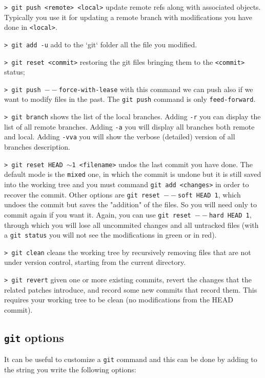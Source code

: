 \documentclass[11pt]{article}
\newcommand{\cmd}[1]{\colorbox{light-gray}{\textcolor{gio}{\texttt{#1}}}}
\begin{document}
\begin{multicols}{2}
\cmd{> git push <remote> <local>} update remote refs along with associated objects. Typically you use it for updating a remote branch with modifications you have done in \texttt{<local>}.

\cmd{> git add -u} add to the `git` folder all the file you modified.

\cmd{> git reset <commit>} restoring the git files bringing them to the \texttt{<commit>} status;

\cmd{> git push $--$force-with-lease} with this command we can push also if we want to modify files in the past. The \texttt{git push} command is only \texttt{feed-forward}.

\cmd{> git branch} shows the list of the local branches. Adding \texttt{-r} you can display the list of all remote branches. Adding \texttt{-a} you will display all branches both remote and local. Adding \cmd{-vva} you will show the verbose (detailed) version of all branches description.  

\cmd{> git reset HEAD $\sim$1 <filename>} undos the last commit you have done. The default mode is the \texttt{mixed} one, in which the commit is undone but it is still saved into the working tree and you must command \texttt{git add <changes>} in order to recover the commit. Other options are \texttt{git reset $--$soft HEAD~1}, which undoes the commit but saves the "addition" of the files. So you will need only to commit again if you want it. Again, you can use \texttt{git reset $--$hard HEAD~1}, through which you will lose all uncommited changes and all untracked files (with a \texttt{git status} you will not see the modifications in green or in red).

\cmd{> git clean} cleans the working tree by recursively removing files that are not under version control, starting from the current directory.

\cmd{> git revert} given one or more existing commits, revert the changes that the related patches introduce, and record some new commits that record them. This requires your working tree to be clean (no modifications from the HEAD commit).

\subsection{\texttt{git} options}

It can be useful to customize a \texttt{git} command and this can be done by adding to the string you write the following options: \\


\end{multicols}
\end{document}
